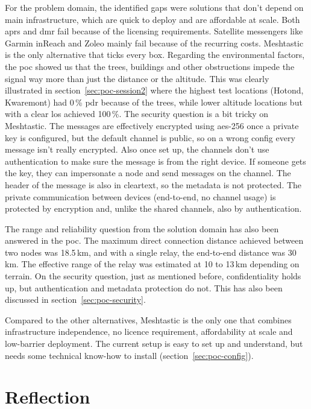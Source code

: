 For the problem domain, the identified gaps were solutions that don't depend on main infrastructure, which are quick to deploy and are affordable at scale. Both \gls{aprs} and \gls{dmr} fail because of the licensing requirements. Satellite messengers like Garmin inReach and Zoleo mainly fail because of the recurring costs.
Meshtastic is the only alternative that ticks every box. Regarding the environmental factors, the \gls{poc} showed us that the trees, buildings and other obstructions impede the signal way more than just the distance or the altitude.
This was clearly illustrated in section~\ref{sec:poc-session2} where the highest test locations (Hotond, Kwaremont) had 0\,\% \gls{pdr} because of the trees, while lower altitude locations but with a clear \gls{los} achieved 100\,\%.
The security question is a bit tricky on Meshtastic. The messages are effectively encrypted using \gls{aes}-256 once a private key is configured, but the default channel is public, so on a wrong config every message isn't really encrypted. Also once set up, the channels don't use authentication to make sure the message is from the right device.
If someone gets the key, they can impersonate a node and send messages on the channel. The header of the message is also in cleartext, so the metadata is not protected. The private communication between devices (end-to-end, no channel usage) is protected by encryption and, unlike the shared channels, also by authentication.

The range and reliability question from the solution domain has also been answered in the \gls{poc}.
The maximum direct connection distance achieved between two nodes was 18.5\,km, and with a single relay, the end-to-end distance was 30\,km. The effective range of the relay was estimated at 10 to 13\,km depending on terrain.
On the security question, just as mentioned before, confidentiality holds up, but authentication and metadata protection do not. This has also been discussed in section~\ref{sec:poc-security}.

Compared to the other alternatives, Meshtastic is the only one that combines infrastructure independence, no licence requirement, affordability at scale and low-barrier deployment. The current setup is easy to set up and understand, but needs some technical know-how to install (section~\ref{sec:poc-config}).

\section{Reflection}%
\label{sec:conclusion-reflection}

